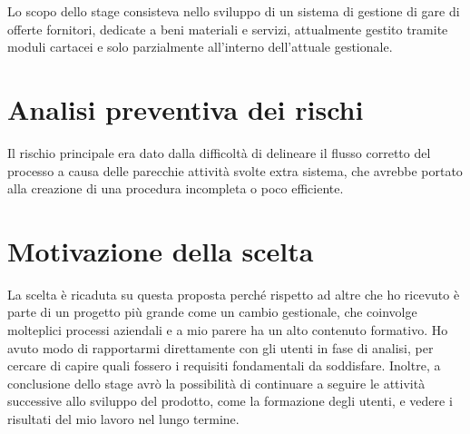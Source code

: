 Lo scopo dello stage consisteva nello sviluppo di un sistema di gestione di gare di offerte fornitori, dedicate a beni materiali e servizi, attualmente gestito tramite moduli cartacei e solo parzialmente all’interno dell’attuale gestionale.

\section{Analisi preventiva dei rischi}

Il rischio principale era dato dalla difficoltà di delineare il flusso corretto del processo a causa delle parecchie attività svolte extra sistema, che avrebbe portato alla creazione di una procedura incompleta o poco efficiente.


\section{Motivazione della scelta}

La scelta è ricaduta su questa proposta perché rispetto ad altre che ho ricevuto è parte di un progetto più grande come un cambio gestionale, che coinvolge molteplici processi aziendali e a mio parere ha un alto contenuto formativo. Ho avuto modo di rapportarmi direttamente con gli utenti in fase di analisi, per cercare di capire quali fossero i requisiti fondamentali da soddisfare. Inoltre, a conclusione dello stage avrò la possibilità di continuare a seguire le attività successive allo sviluppo del prodotto, come la formazione degli utenti, e vedere i risultati del mio lavoro nel lungo termine.